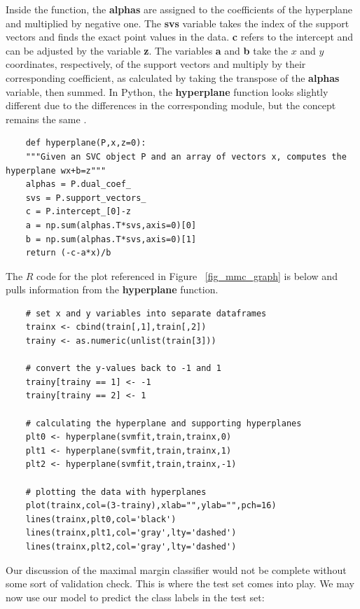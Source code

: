 \documentclass[12pt]{article}
\begin{document}
Inside the function, the \textbf{alphas} are assigned to the coefficients of the hyperplane and multiplied by negative one. The \textbf{svs} variable takes the index of the support vectors and finds the exact point values in the data. \textbf{c} refers to the intercept and can be adjusted by the variable \textbf{z}. The variables \textbf{a} and \textbf{b} take the $x$ and $y$ coordinates, respectively, of the support vectors and multiply by their corresponding coefficient, as calculated by taking the transpose of the \textbf{alphas} variable, then summed. In Python, the \textbf{hyperplane} function looks slightly different due to the differences in the corresponding module, but the concept remains the same \cite{teitelbaum2021svm}.

\begin{verbatim}
    def hyperplane(P,x,z=0):
    """Given an SVC object P and an array of vectors x, computes the hyperplane wx+b=z"""
    alphas = P.dual_coef_
    svs = P.support_vectors_
    c = P.intercept_[0]-z
    a = np.sum(alphas.T*svs,axis=0)[0]
    b = np.sum(alphas.T*svs,axis=0)[1]
    return (-c-a*x)/b
\end{verbatim}

The $R$ code for the plot referenced in Figure ~\ref{fig_mmc_graph} is below and pulls information from the \textbf{hyperplane} function.

\begin{verbatim}
    # set x and y variables into separate dataframes
    trainx <- cbind(train[,1],train[,2])
    trainy <- as.numeric(unlist(train[3]))
    
    # convert the y-values back to -1 and 1
    trainy[trainy == 1] <- -1
    trainy[trainy == 2] <- 1
    
    # calculating the hyperplane and supporting hyperplanes
    plt0 <- hyperplane(svmfit,train,trainx,0)
    plt1 <- hyperplane(svmfit,train,trainx,1)
    plt2 <- hyperplane(svmfit,train,trainx,-1)
    
    # plotting the data with hyperplanes
    plot(trainx,col=(3-trainy),xlab="",ylab="",pch=16)
    lines(trainx,plt0,col='black')
    lines(trainx,plt1,col='gray',lty='dashed')
    lines(trainx,plt2,col='gray',lty='dashed')
\end{verbatim}

Our discussion of the maximal margin classifier would not be complete without some sort of validation check. This is where the test set comes into play. We may now use our model to predict the class labels in the test set:
\end{document}
